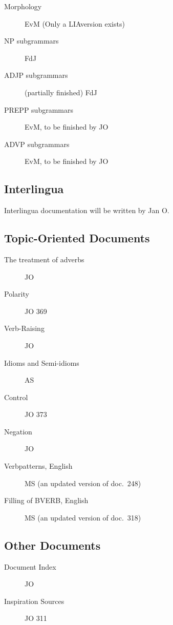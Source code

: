 \begin{description}
  \item[Morphology] EvM (Only a LIAversion exists)
  \item[NP subgrammars] FdJ
  \item[ADJP subgrammars] (partially finished) FdJ
  \item[PREPP subgrammars] EvM, to be finished by JO
  \item[ADVP  subgrammars] EvM, to be finished by JO
\end{description}

\subsection{Interlingua}
Interlingua documentation will be written by Jan O.

\subsection{Topic-Oriented Documents}

\begin{description}
  \item[The treatment of adverbs] JO
  \item[Polarity] JO 369
  \item[Verb-Raising] JO
  \item[Idioms and Semi-idioms] AS
  \item[Control] JO 373
  \item[Negation] JO
  \item[Verbpatterns, English] MS (an updated version of doc.\ 248)
  \item[Filling of BVERB, English] MS (an updated version of doc.\ 318)
\end{description}


\subsection{Other Documents}

\begin{description} 
  \item[Document Index] JO
  \item[Inspiration Sources] JO 311
\end{description}




